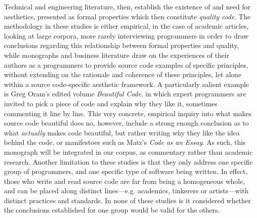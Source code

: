 Technical and engineering literature, then, establish the existence of and need for aesthetics, presented as formal properties which then constitute \emph{quality code}. The methodology in these studies is either empirical, in the case of academic articles, looking at large corpora, more rarely interviewing programmers in order to draw conclusions regarding this relationship between formal properties and quality, while monographs and business literature draw on the experiences of their authors as a programmers to provide source code examples of specific principles, without extending on the rationale and coherence of these principles, let alone within a source code-specific aesthetic framework. A particularly salient example is Greg Oram's edited volume \emph{Beautiful Code}, in which expert programmers are invited to pick a piece of code and explain why they like it, sometimes commenting it line by line\cite{oram_beautiful_2007}. This very concrete, empirical inquiry into what makes source code beautiful does no, however, include a strong enough conclusion as to what \emph{actually} makes code beautiful, but rather writing why they like the idea behind the code, or manifestoes such as Matz's \emph{Code as an Essay}. As such, this monograph will be integrated in our corpus, as commentary rather than academic research. Another limitation to these studies is that they only address one specific group of programmers, and one specific type of software being written. In effect, those who write and read source code are far from being a homogeneous whole, and can be placed along distinct lines—e.g. academics, tinkerers or artists—with distinct practices and standards\cite{hayes_cultures_2017}. In none of these studies is it considered whether the conclusions established for one group would be valid for the others.

